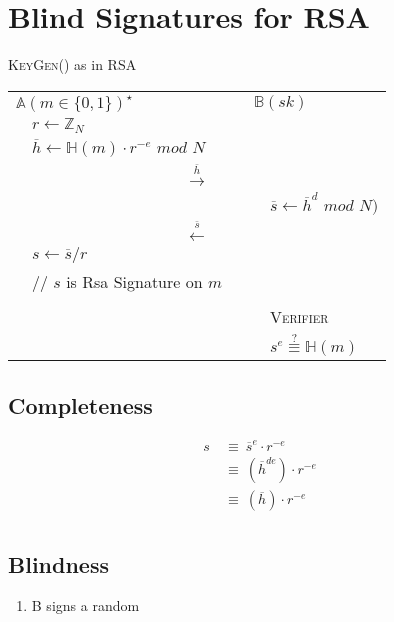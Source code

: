 \documentclass{report}
\begin{document}
\section{Blind Signatures for RSA}
\begin{adjustwidth}{2em}{2em}
	\textsc{KeyGen}() as in RSA \\
	\begin{tabular}{lllll}
		\multicolumn{2}{l}{$\mathbb{A} (m \in \{0,1\})^{\star}$} & & \multicolumn{2}{l}{$\mathbb{B} (sk)$} \\
		& $r \leftarrow \mathbb{Z}_N$ \\
		& $\overline{h} \leftarrow \mathbb{H}(m) \cdot r^{-e} \textit{ mod } N$ \\
		\multicolumn{5}{c}{$\stackrel{\overline{h}}{\longrightarrow}$} \\
		& & & & $\overline{s} \leftarrow \overline{h}^d \textit{ mod } N)$ \\
		\multicolumn{5}{c}{$\stackrel{\overline{s}}{\longleftarrow}$} \\
		& $s \leftarrow \overline{s} / r$ \\
		& // $s$ is Rsa Signature on $m$ \\
		\\
		& & & & \textsc{Verifier} \\
		& & & & $s^e \stackrel{?}{\equiv} \mathbb{H}(m)$ \\
	\end{tabular}
	\subsection{Completeness}
	\begin{align*}
		s \ & \equiv \ \overline{s}^e \cdot r^{-e} \\
		& \equiv \ (\overline{h}^{de}) \cdot r^{-e} \\
		& \equiv \ (\overline{h}) \cdot r^{-e} \\
	\end{align*}
	\subsection{Blindness}
	\begin{adjustwidth}{2em}{}
		\begin{enumerate}[-]
			\item B signs a random
		\end{enumerate}
	\end{adjustwidth}
\end{adjustwidth}
\end{document}
